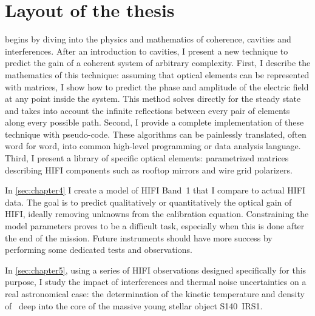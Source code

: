 \section{Layout of the thesis}

 begins by diving into the physics and mathematics of coherence, cavities and interferences.
After an introduction to cavities, I present a new technique to predict the gain of a coherent system of arbitrary complexity.
First, I describe the mathematics of this technique:
assuming that optical elements can be represented with matrices, I show how to predict the phase and amplitude of the electric field at any point inside the system.
This method solves directly for the steady state and takes into account the infinite reflections between every pair of elements along every possible path.
Second, I provide a complete implementation of these technique with pseudo-code.
These algorithms can be painlessly translated, often word for word, into common high-level programming or data analysis language.
Third, I present a library of specific optical elements: parametrized matrices describing HIFI components such as rooftop mirrors and wire grid polarizers.

In \cref{sec:chapter4} I create a model of HIFI Band~1 that I compare to actual HIFI data.
The goal is to predict qualitatively or quantitatively the optical gain of HIFI, ideally removing unknowns from the calibration equation.
Constraining the model parameters proves to be a difficult task, especially when this is done after the end of the mission.
Future instruments should have more success by performing some dedicated tests and observations.

In \cref{sec:chapter5}, using a series of HIFI observations designed specifically for this purpose, I study the impact of interferences and thermal noise uncertainties on a real astronomical case: the determination of the kinetic temperature and density of~ deep into the core of the massive young stellar object S140~IRS1.


\FloatBarrier
